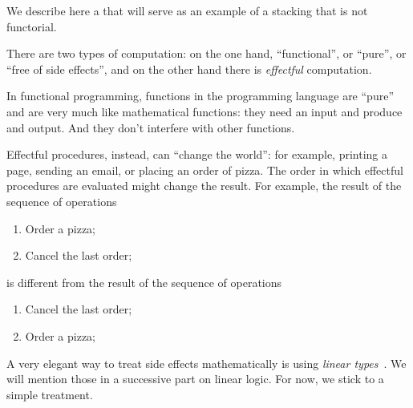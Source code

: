 We describe here a  that will serve as an example of a stacking  that is not functorial.

There are two types of computation: on the one hand, ``functional'', or ``pure'', or ``free of side effects'', and on the other hand there is \emph{effectful} computation.

In functional programming, functions in the programming language are ``pure'' and are very much like mathematical functions: they need an input and produce and output.
And they don't interfere with other functions.

Effectful procedures, instead, can ``change the world'': for example, printing a page, sending an email, or placing an order of pizza.
The order in which effectful procedures are evaluated might change the result.
For example, the result of the sequence of operations
%
\begin{enumerate}
    \item Order a pizza;
    \item Cancel the last order;
\end{enumerate}
%
is different from the result of the sequence of operations
%
\begin{enumerate}
    \item Cancel the last order;
    \item Order a pizza;
\end{enumerate}

A very elegant way to treat side effects mathematically is using \emph{linear types}~\cite{Wadler90lineartypes}.
We will mention those in a successive part on linear logic.
For now, we stick to a simple treatment.

\begin{marginfigure}
    \centering
    \\
    \caption{}
    \label{fig:effects12}
\end{marginfigure}

